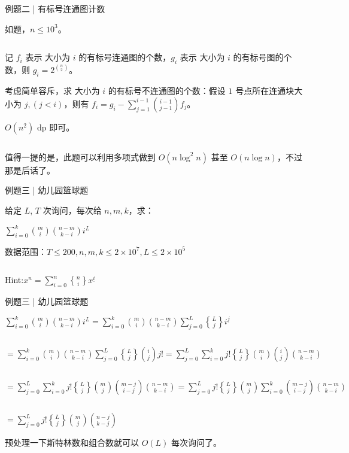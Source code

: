 \documentclass{beamer}
\begin{document}
\begin{frame}{例题二 | 有标号连通图计数}

    如题，$n\leq10^3$。

    $ $
    \pause

    记 $f_i$ 表示 大小为 $i$ 的有标号连通图的个数，$g_i$ 表示 大小为 $i$ 的有标号图的个数，则 $g_i = 2 ^{\binom n2}$。

    考虑简单容斥，求 大小为 $i$ 的有标号不连通图的个数：假设 $1$ 号点所在连通块大小为 $j,(j<i)$，则有 $f_i = g_i - \sum\limits_{j = 1}^{i - 1}{\binom {i - 1}{j - 1}f_j}$。

    $O(n^2)$ dp 即可。

    $ $
    \pause

    值得一提的是，此题可以利用多项式做到 $O(n\log^2{n})$ 甚至 $O(n\log{n})$，不过那是后话了。
    
\end{frame}

\begin{frame}{例题三 | 幼儿园篮球题}
    
    给定 $L$, $T$ 次询问，每次给 $n,m,k$，求：
    
    $\sum\limits_{i=0}^k{\binom mi\binom{n-m}{k-i}i^L}$

    数据范围：$T\leq200,n,m,k\leq2\times10^7,L\leq2\times10^5$

    $ $
    \pause

    Hint:$x^n=\sum\limits_{i = 0}^n{{n\brace i}x^{\underline i}}$
    
\end{frame}

\begin{frame}{例题三 | 幼儿园篮球题}

    $\sum\limits_{i=0}^k{\binom mi\binom{n-m}{k-i}i^L} = \sum\limits_{i = 0}^k{\binom mi\binom {n-m}{k-i}\sum\limits_{j=0}^L{{L\brace j}i^{\underline j}}}$

    $ $
    
    $=\sum\limits_{i = 0}^k{\binom mi\binom {n-m}{k-i}\sum\limits_{j=0}^L{{L\brace j}\binom ij j!}} = \sum\limits_{j = 0}^L{\sum\limits_{i = 0}^k{j!{L\brace j}\binom mi\binom ij\binom{n-m}{k-i}}}$

    $ $

    $=\sum\limits_{j = 0}^L{\sum\limits_{i = 0}^k{j!{L\brace j}\binom mj\binom {m-j}{i-j}\binom{n-m}{k-i}}}=\sum\limits_{j = 0}^L{j!{L\brace j}\binom mj\sum\limits_{i = 0}^k{\binom {m-j}{i-j}\binom{n-m}{k-i}}}$

    $ $

    $=\sum\limits_{j = 0}^L{j!{L\brace j}\binom mj\binom {n-j}{k-j}}$

    预处理一下斯特林数和组合数就可以 $O(L)$ 每次询问了。
    
\end{frame}
\end{document}
